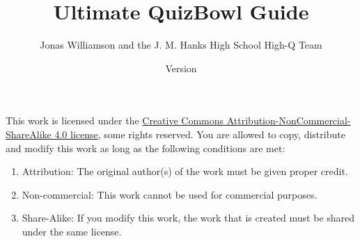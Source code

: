 \documentclass[12pt]{book}
\newcommand{\mytitle}{Ultimate QuizBowl Guide}
\begin{document}
	\frontmatter
	\title{\mytitle}

	
	\author{Jonas Williamson and the  J. M. Hanks High School High-Q Team}
	\date{Version \the\year\the\month\the\day}
	\maketitle
	\begin{center}

			\huge \cc \the\year
			\vspace{0.5 in}
			
			\byncsa
	\normalsize
		\end{center}
		\vspace{2 in}	
	This work is licensed under the \href{https://creativecommons.org/licenses/by-nc-sa/4.0/legalcode}{Creative Commons Attribution-NonCommercial-ShareAlike 4.0 license}, some rights reserved.  You are allowed to copy, distribute and modify this work as long as the following conditions are met:
	\begin{enumerate}
		\item Attribution: The original author(s) of the work must be given proper credit.
		\item Non-commercial: This work cannot be used for commercial purposes.
		\item Share-Alike: If you modify this work, the work that is created must be shared under the same license. 
	\end{enumerate}


	
	
	
	
	
	
	\tableofcontents

	\mainmatter
	
	






	
	







	

		
	









		
		
	
		
\end{document}
